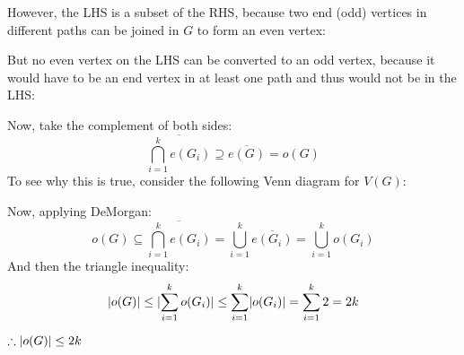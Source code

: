 \documentclass[letterpaper,12pt,fleqn]{article}
\newcommand{\comp}[1]{\overline{#1}}
\begin{document}
\begin{theproof}

  However, the LHS is a subset of the RHS, because two end (odd) vertices in
  different paths can be joined in $G$ to form an even vertex:
  

  But no even vertex on the LHS can be converted to an odd vertex, because it
  would have to be an end vertex in at least one path and thus would not be in
  the LHS:

\end{theproof}

Now, take the complement of both sides:
\[\comp{\bigcap_{i=1}^ke(G_i)}\supseteq\comp{e(G)}=o(G)\]
To see why this is true, consider the following Venn diagram for $V(G)$:


Now, applying DeMorgan:
\[o(G)\subseteq\comp{\bigcap_{i=1}^ke(G_i)}=\bigcup_{i=1}^k\comp{e(G_i)}=
\bigcup_{i=1}^ko(G_i)\]
And then the triangle inequality:
\[\lvert o(G)\rvert\le\lvert\sum_{i=1}^ko(G_i)\rvert\le\sum_{i=1}^k\lvert o(G_i)\rvert=
\sum_{i=1}^k2=2k\]

$\therefore\lvert o(G)\rvert\le2k$
\end{document}
